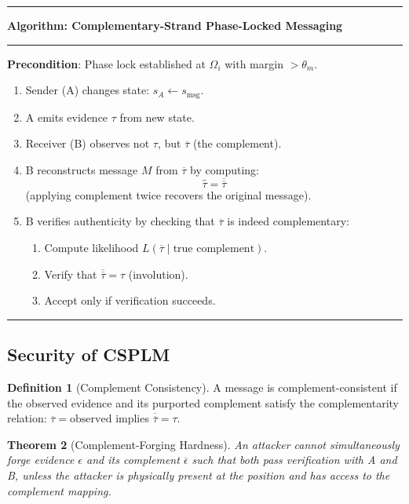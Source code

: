 \documentclass[twocolumn,10pt,a4paper]{article}
\theoremstyle{plain}
\newtheorem{theorem}{Theorem}[section]
\theoremstyle{definition}
\newtheorem{definition}[theorem]{Definition}
\newcommand{\comp}[1]{\overline{#1}}
\newenvironment{algo}[1]
  {\par\medskip\noindent\rule{\linewidth}{0.8pt}\par\nobreak\smallskip
   \noindent\textbf{Algorithm: #1}\par\nobreak\smallskip
   \noindent\rule{\linewidth}{0.4pt}\par\nobreak\smallskip}
  {\par\smallskip\noindent\rule{\linewidth}{0.8pt}\par\medskip}
\begin{document}
\begin{algo}{Complementary-Strand Phase-Locked Messaging}
\textbf{Precondition}: Phase lock established at $\Omega_i$ with margin $> \theta_m$.

\begin{enumerate}
\item Sender (A) changes state: $s_A \leftarrow s_{\text{msg}}$.
\item A emits evidence $\tau$ from new state.
\item Receiver (B) observes not $\tau$, but $\comp{\tau}$ (the complement).
\item B reconstructs message $M$ from $\comp{\tau}$ by computing:
  \[
  \hat{\tau} = \comp{\comp{\tau}}
  \]
  (applying complement twice recovers the original message).
\item B verifies authenticity by checking that $\comp{\tau}$ is indeed complementary:
  \begin{enumerate}
  \item Compute likelihood $L(\comp{\tau} \mid \text{true complement})$.
  \item Verify that $\comp{\comp{\tau}} = \tau$ (involution).
  \item Accept only if verification succeeds.
  \end{enumerate}
\end{enumerate}
\end{algo}

\subsection{Security of CSPLM}

\begin{definition}[Complement Consistency]
A message is complement-consistent if the observed evidence and its purported complement satisfy the complementarity relation: $\comp{\tau} = \text{observed}$ implies $\comp{\comp{\tau}} = \tau$.
\end{definition}

\begin{theorem}[Complement-Forging Hardness]
An attacker cannot simultaneously forge evidence $\epsilon$ and its complement $\comp{\epsilon}$ such that both pass verification with A and B, unless the attacker is physically present at the position and has access to the complement mapping.
\end{theorem}
\end{document}
